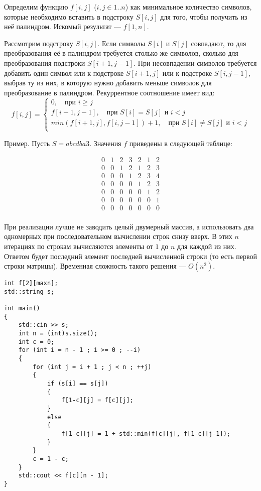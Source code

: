 \documentclass[14pt,openany]{book}
\begin{document}
Определим функцию $f[i,j]$ ($i, j \in 1..n$) как минимальное количество символов, которые
необходимо вставить в подстроку $S[i,j]$ для того, чтобы получить из неё палиндром.
Искомый результат --- $f[1,n]$.

Рассмотрим подстроку $S[i,j]$. Если символы $S[i]$ и $S[j]$ совпадают, то для преобразования её
в палиндром требуется столько же символов, сколько для преобразования подстроки $S[i+1,j-1]$.
При несовпадении символов требуется добавить один символ или к подстроке $S[i+1,j]$ или 
к подстроке $S[i,j-1]$, выбрав ту из них, в которую нужно добавить меньше символов для
преобразование в палиндром.
Рекуррентное соотношение имеет вид:
$$
  f[i,j] = \left\{\begin{array}{l}
      0, \quad \text{при $i \ge j$} \\
      f[i+1, j-1], \quad \text{при $S[i] = S[j]$ и $i < j$} \\
      min(f[i+1,j], f[i, j-1]) + 1, \quad \text{при $S[i] \neq S[j]$ и $i < j$} \\
  \end{array}\right.
$$

Пример. Пусть $S = abcdba3$. Значения $f$ приведены в следующей таблице:

$$\begin{array}{ccccccc}
0 & 1 & 2 & 3 & 2 & 1 & 2 \\
0 & 0 & 1 & 2 & 1 & 2 & 3 \\
0 & 0 & 0 & 1 & 2 & 3 & 4 \\
0 & 0 & 0 & 0 & 1 & 2 & 3 \\
0 & 0 & 0 & 0 & 0 & 1 & 2 \\
0 & 0 & 0 & 0 & 0 & 0 & 1 \\
0 & 0 & 0 & 0 & 0 & 0 & 0 \\
\end{array}$$

При реализации лучше не заводить целый двумерный массив, а использовать два
одномерных при последовательном вычислении строк снизу вверх.
В этих $n$ итерациях по строкам вычисляются элементы от $1$ до $n$ для каждой из них.
Ответом будет последний элемент последней вычисленной строки (то есть первой строки
матрицы). Временная сложность такого решения --- $O(n^2)$.

\begin{lstlisting}
int f[2][maxn];
std::string s;

int main()
{
    std::cin >> s;
    int n = (int)s.size();
    int c = 0;
    for (int i = n - 1 ; i >= 0 ; --i)
    {
        for (int j = i + 1 ; j < n ; ++j)
        {
            if (s[i] == s[j])
            {
                f[1-c][j] = f[c][j];
            }
            else
            {
                f[1-c][j] = 1 + std::min(f[c][j], f[1-c][j-1]);
            }
        }
        c = 1 - c;
    }
    std::cout << f[c][n - 1];
}
\end{lstlisting}
\end{document}
